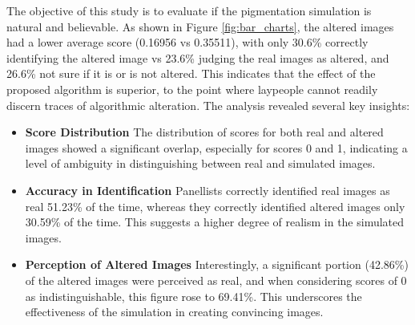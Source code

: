 \begin{spacing}{1.5}
\begin{table}[t!]
    \label{tab:image_perception_stats}
\end{table}
The objective of this study is to evaluate if the pigmentation simulation is natural and believable. As shown in Figure \ref{fig:bar_charts}, the altered images had a lower average score (0.16956 vs 0.35511), with only 30.6\% correctly identifying the altered image vs 23.6\% judging the real images as altered, and 26.6\% not sure if it is or is not altered. This indicates that the effect of the proposed algorithm is superior, to the point where laypeople cannot readily discern traces of algorithmic alteration.
The analysis revealed several key insights:
\begin{itemize}
    \item \textbf{Score Distribution} The distribution of scores for both real and altered images showed a significant overlap, especially for scores 0 and 1, indicating a level of ambiguity in distinguishing between real and simulated images.
    \item \textbf{Accuracy in Identification} Panellists correctly identified real images as real 51.23\% of the time, whereas they correctly identified altered images only 30.59\% of the time. This suggests a higher degree of realism in the simulated images.
    \item \textbf{Perception of Altered Images} Interestingly, a significant portion (42.86\%) of the altered images were perceived as real, and when considering scores of 0 as indistinguishable, this figure rose to 69.41\%. This underscores the effectiveness of the simulation in creating convincing images.
\end{itemize}
\end{spacing}
\newpage
